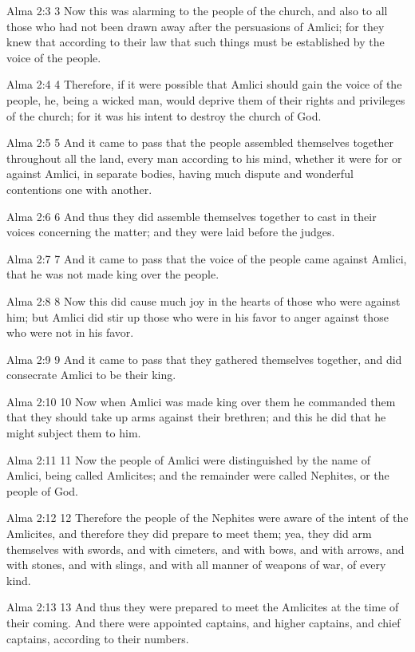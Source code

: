 Alma 2:3
 3 Now this was alarming to the people of the church, and also to
all those who had not been drawn away after the persuasions of
Amlici; for they knew that according to their law that such
things must be established by the voice of the people.

Alma 2:4
 4 Therefore, if it were possible that Amlici should gain the
voice of the people, he, being a wicked man, would deprive them
of their rights and privileges of the church; for it was his
intent to destroy the church of God.

Alma 2:5
 5 And it came to pass that the people assembled themselves
together throughout all the land, every man according to his
mind, whether it were for or against Amlici, in separate bodies,
having much dispute and wonderful contentions one with another.

Alma 2:6
 6 And thus they did assemble themselves together to cast in
their voices concerning the matter; and they were laid before the
judges.

Alma 2:7
 7 And it came to pass that the voice of the people came against
Amlici, that he was not made king over the people.

Alma 2:8
 8 Now this did cause much joy in the hearts of those who were
against him; but Amlici did stir up those who were in his favor
to anger against those who were not in his favor.

Alma 2:9
 9 And it came to pass that they gathered themselves together,
and did consecrate Amlici to be their king.

Alma 2:10
 10 Now when Amlici was made king over them he commanded them
that they should take up arms against their brethren; and this he
did that he might subject them to him.

Alma 2:11
 11 Now the people of Amlici were distinguished by the name of
Amlici, being called Amlicites; and the remainder were called
Nephites, or the people of God.

Alma 2:12
 12 Therefore the people of the Nephites were aware of the intent
of the Amlicites, and therefore they did prepare to meet them;
yea, they did arm themselves with swords, and with cimeters, and
with bows, and with arrows, and with stones, and with slings, and
with all manner of weapons of war, of every kind.

Alma 2:13
 13 And thus they were prepared to meet the Amlicites at the time
of their coming. And there were appointed captains, and higher
captains, and chief captains, according to their numbers.

